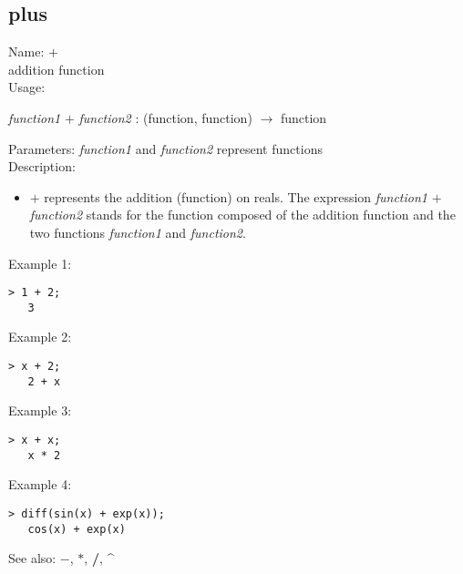 \subsection{ plus }
\noindent Name: \textbf{$+$}\\
addition function\\

\noindent Usage: 
\begin{center}
\emph{function1} \textbf{$+$} \emph{function2} : (\textsf{function}, \textsf{function}) $\rightarrow$ \textsf{function}\\
\end{center}
Parameters: 
\emph{function1} and \emph{function2} represent functions\\

\noindent Description: \begin{itemize}

\item \textbf{$+$} represents the addition (function) on reals. 
   The expression \emph{function1} \textbf{$+$} \emph{function2} stands for
   the function composed of the addition function and the two
   functions \emph{function1} and \emph{function2}.
\end{itemize}
\noindent Example 1: 
\begin{center}\begin{minipage}{14.8cm}\begin{Verbatim}[frame=single]
   > 1 + 2;
   3
\end{Verbatim}
\end{minipage}\end{center}
\noindent Example 2: 
\begin{center}\begin{minipage}{14.8cm}\begin{Verbatim}[frame=single]
   > x + 2;
   2 + x
\end{Verbatim}
\end{minipage}\end{center}
\noindent Example 3: 
\begin{center}\begin{minipage}{14.8cm}\begin{Verbatim}[frame=single]
   > x + x;
   x * 2
\end{Verbatim}
\end{minipage}\end{center}
\noindent Example 4: 
\begin{center}\begin{minipage}{14.8cm}\begin{Verbatim}[frame=single]
   > diff(sin(x) + exp(x));
   cos(x) + exp(x)
\end{Verbatim}
\end{minipage}\end{center}
See also: \textbf{$-$}, \textbf{$*$}, \textbf{/}, \textbf{\^}
